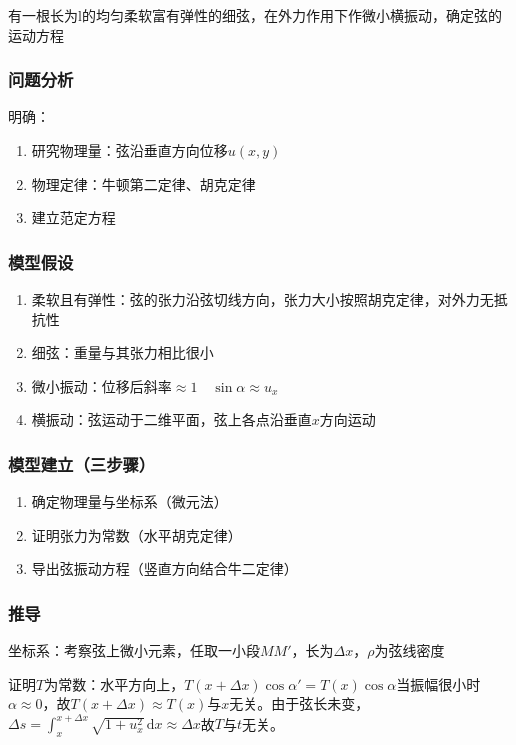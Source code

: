有一根长为l的均匀柔软富有弹性的细弦，在外力作用下作微小横振动，确定弦的运动方程

\subsubsection{问题分析}

明确：
\begin{enumerate}
	\item 研究物理量：弦沿垂直方向位移\(u(x,y)\)
	\item 物理定律：牛顿第二定律、胡克定律
	\item 建立范定方程
\end{enumerate}

\subsubsection{模型假设}

\begin{enumerate}
	\item 柔软且有弹性：弦的张力沿弦切线方向，张力大小按照胡克定律，对外力无抵抗性
	\item 细弦：重量与其张力相比很小
	\item 微小振动：位移后斜率\(\approx1 \quad\sin\alpha\approx u_x\)
	\item 横振动：弦运动于二维平面，弦上各点沿垂直\(x\)方向运动
\end{enumerate}

\subsubsection{模型建立（三步骤）}

\begin{enumerate}
	\item 确定物理量与坐标系（微元法）
	\item 证明张力为常数（水平胡克定律）
	\item 导出弦振动方程（竖直方向结合牛二定律）
\end{enumerate}

\subsubsection{推导}

坐标系：考察弦上微小元素，任取一小段\(MM'\)，长为\(\Delta x\)，\(\rho\)为弦线密度

证明\(T\)为常数：水平方向上，\(T\left(x+\Delta x\right)\cos{\alpha'}=T(x)\cos{\alpha}\)当振幅很小时\(\alpha\approx0\)，故\(T\left(x+\Delta x\right)\approx T(x)\)与\(x\)无关。由于弦长未变，\(\Delta s=\int_{x}^{x+\Delta x}{\sqrt{1+u_x^2}\,\mathrm{d}x}\approx\Delta x\)故\(T\)与\(t\)无关。

